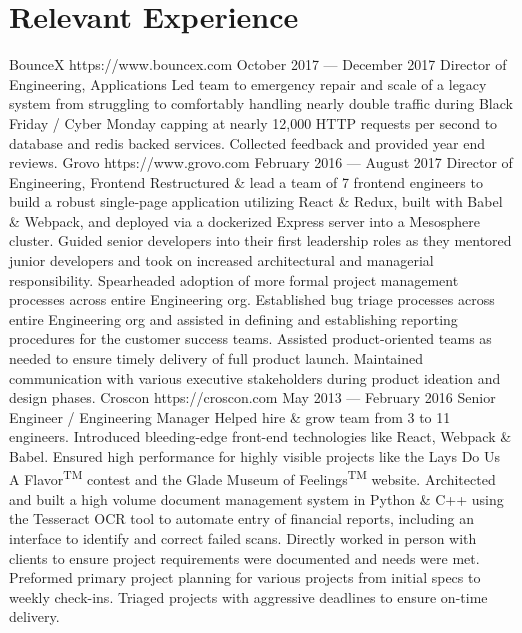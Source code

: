 \documentclass{resume}
\begin{document}
\smallskip

\section{Relevant Experience}

\employer
    {BounceX}
    {https://www.bouncex.com}
    {October 2017 --- December 2017}
    {Director of Engineering, Applications}
    {Led team to emergency repair and scale of a legacy system from struggling to comfortably handling nearly double traffic during Black Friday / Cyber Monday capping at nearly 12,000 HTTP requests per second to database and redis backed services. Collected feedback and provided year end reviews.}
\employer
    {Grovo}
    {https://www.grovo.com}
    {February 2016 --- August 2017}
    {Director of Engineering, Frontend}
    {Restructured \& lead a team of 7 frontend engineers to build a robust single-page application utilizing React \& Redux, built with Babel \& Webpack, and deployed via a dockerized Express server into a Mesosphere cluster. Guided senior developers into their first leadership roles as they mentored junior developers and took on increased architectural and managerial responsibility. Spearheaded adoption of more formal project management processes across entire Engineering org. Established bug triage processes across entire Engineering org and assisted in defining and establishing reporting procedures for the customer success teams. Assisted product-oriented teams as needed to ensure timely delivery of full product launch. Maintained communication with various executive stakeholders during product ideation and design phases.}
\employer
    {Croscon}
    {https://croscon.com}
    {May 2013 --- February 2016}
    {Senior Engineer / Engineering Manager}
    {Helped hire \& grow team from 3 to 11 engineers. Introduced bleeding-edge front-end technologies like React, Webpack \& Babel. Ensured high performance for highly visible projects like the Lays\textsuperscript{\textregistered} Do Us A Flavor\textsuperscript{TM} contest and the Glade\textsuperscript{\textregistered} Museum of Feelings\textsuperscript{TM} website. Architected and built a high volume document management system in Python \& C++ using the Tesseract OCR tool to automate entry of financial reports, including an interface to identify and correct failed scans. Directly worked in person with clients to ensure project requirements were documented and needs were met. Preformed primary project planning for various projects from initial specs to weekly check-ins. Triaged projects with aggressive deadlines to ensure on-time delivery.}
\end{document}
